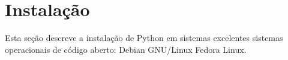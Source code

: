 \section{Instalação}\label{sec:instalação}

Esta seção descreve a instalação de Python em sistemas excelentes sistemas
operacionais de código aberto: Debian GNU/Linux Fedora Linux.
